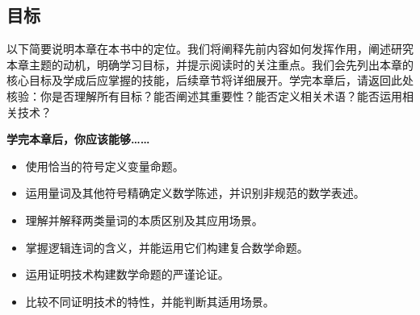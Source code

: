 \subsection{目标}

以下简要说明本章在本书中的定位。我们将阐释先前内容如何发挥作用，阐述研究本章主题的动机，明确学习目标，并提示阅读时的关注重点。我们会先列出本章的核心目标及学成后应掌握的技能，后续章节将详细展开。学完本章后，请返回此处核验：你是否理解所有目标？能否阐述其重要性？能否定义相关术语？能否运用相关技术？

\textbf{学完本章后，你应该能够……}

\begin{itemize}
    \item 使用恰当的符号定义变量命题。
    \item 运用量词及其他符号精确定义数学陈述，并识别非规范的数学表述。
    \item 理解并解释两类量词的本质区别及其应用场景。
    \item 掌握逻辑连词的含义，并能运用它们构建复合数学命题。
    \item 运用证明技术构建数学命题的严谨论证。
    \item 比较不同证明技术的特性，并能判断其适用场景。
\end{itemize}

